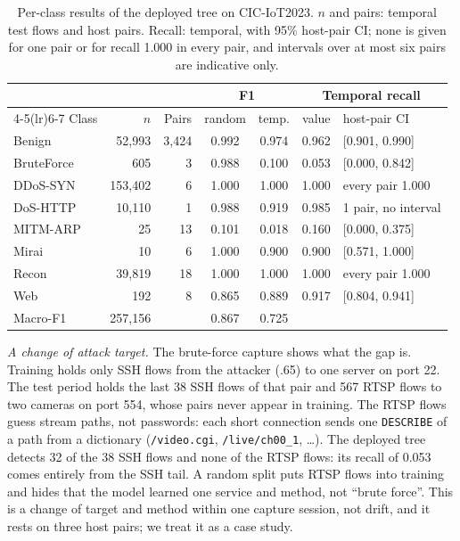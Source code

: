 \begin{table}[t]
\centering
\caption{Per-class results of the deployed tree on CIC-IoT2023. $n$ and pairs: temporal test flows and host pairs. Recall: temporal, with 95\% host-pair CI; none is given for one pair or for recall 1.000 in every pair, and intervals over at most six pairs are indicative only.}
\label{tab:perclass}
\footnotesize
\setlength{\tabcolsep}{3pt}
\begin{tabular}{lrrcccl}
\toprule
 & & & \multicolumn{2}{c}{F1} & \multicolumn{2}{c}{Temporal recall} \\
\cmidrule(lr){4-5}\cmidrule(lr){6-7}
Class & $n$ & Pairs & random & temp. & value & host-pair CI \\
\midrule
Benign     &  52,993 & 3,424 & 0.992 & 0.974 & 0.962 & [0.901, 0.990] \\
BruteForce &     605 &     3 & 0.988 & 0.100 & 0.053 & [0.000, 0.842] \\
DDoS-SYN   & 153,402 &     6 & 1.000 & 1.000 & 1.000 & every pair 1.000 \\
DoS-HTTP   &  10,110 &     1 & 0.988 & 0.919 & 0.985 & 1 pair, no interval \\
MITM-ARP   &      25 &    13 & 0.101 & 0.018 & 0.160 & [0.000, 0.375] \\
Mirai      &      10 &     6 & 1.000 & 0.900 & 0.900 & [0.571, 1.000] \\
Recon      &  39,819 &    18 & 1.000 & 1.000 & 1.000 & every pair 1.000 \\
Web        &     192 &     8 & 0.865 & 0.889 & 0.917 & [0.804, 0.941] \\
\midrule
Macro-F1   & 257,156 &       & 0.867 & 0.725 & & \\
\bottomrule
\end{tabular}
\end{table}

\emph{A change of attack target.} The brute-force capture shows what the gap is. Training holds only SSH flows from the attacker (.65) to one server on port 22. The test period holds the last 38 SSH flows of that pair and 567 RTSP flows to two cameras on port 554, whose pairs never appear in training. The RTSP flows guess stream paths, not passwords: each short connection sends one \texttt{DESCRIBE} of a path from a dictionary (\texttt{/video.cgi}, \texttt{/live/ch00\_1}, \ldots). The deployed tree detects 32 of the 38 SSH flows and none of the RTSP flows: its recall of 0.053 comes entirely from the SSH tail. A random split puts RTSP flows into training and hides that the model learned one service and method, not ``brute force''. This is a change of target and method within one capture session, not drift, and it rests on three host pairs; we treat it as a case study.

